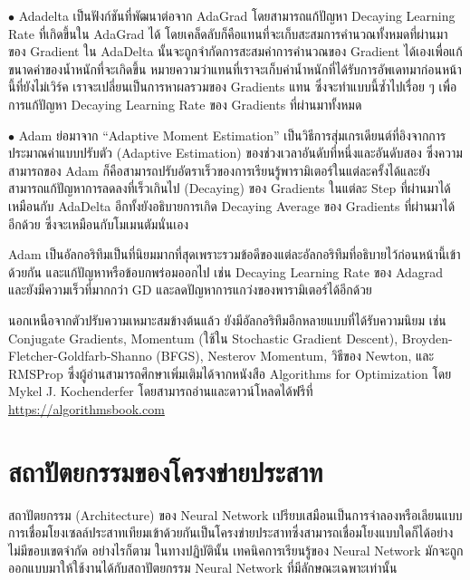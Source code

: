 \noindent $\bullet$ Adadelta เป็นฟังก์ชันที่พัฒนาต่อจาก AdaGrad โดยสามารถแก้ปัญหา Decaying Learning Rate ที่เกิดขึ้นใน
AdaGrad ได้ โดยเคล็ดลับก็คือแทนที่จะเก็บสะสมการคำนวณทั้งหมดที่ผ่านมาของ Gradient ใน AdaDelta นั้นจะถูกจำกัดการสะสมค่าการคำนวณของ
Gradient ได้เองเพื่อแก้ขนาดค่าของน้ำหนักที่จะเกิดขึ้น หมายความว่าแทนที่เราจะเก็บค่าน้ำหนักที่ได้รับการอัพเดทมาก่อนหน้านี้ที่ยังไม่เวิร์ค
เราจะเปลี่ยนเป็นการหาผลรวมของ Gradients แทน ซึ่งจะทำแบบนี้ซ้ำไปเรื่อย ๆ เพื่อการแก้ปัญหา Decaying Learning Rate ของ Gradients
ที่ผ่านมาทั้งหมด

\noindent $\bullet$ Adam ย่อมาจาก \enquote{Adaptive Moment Estimation} เป็นวิธีการสุ่มเกรเดียนต์ที่อิงจากการประมาณค่าแบบปรับตัว
(Adaptive Estimation) ของช่วงเวลาอันดับที่หนึ่งและอันดับสอง ซึ่งความสามารถของ Adam ก็คือสามารถปรับอัตราเร็วของการเรียนรู้พารามิเตอร์ในแต่ละครั้งได้และยังสามารถแก้ปัญหาการลดลงที่เร็วเกินไป (Decaying) ของ Gradients ในแต่ละ Step ที่ผ่านมาได้เหมือนกับ AdaDelta
อีกทั้งยังอธิบายการเกิด Decaying Average ของ Gradients ที่ผ่านมาได้อีกด้วย ซึ่งจะเหมือนกับโมเมนตัมนั่นเอง

Adam เป็นอัลกอริทึมเป็นที่นิยมมากที่สุดเพราะรวมข้อดีของแต่ละอัลกอริทึมที่อธิบายไว้ก่อนหน้านี้เข้าด้วยกัน และแก้ปัญหาหรือข้อบกพร่อมออกไป
เช่น Decaying Learning Rate ของ Adagrad และยังมีความเร็วที่มากกว่า GD และลดปัญหาการแกว่งของพารามิเตอร์ได้อีกด้วย

นอกเหนือจากตัวปรับความเหมาะสมข้างต้นแล้ว ยังมีอัลกอริทึมอีกหลายแบบที่ได้รับความนิยม เช่น Conjugate Gradients, Momentum (ใช้ใน
Stochastic Gradient Descent), Broyden-Fletcher-Goldfarb-Shanno (BFGS), Nesterov Momentum, วิธีของ Newton, และ
RMSProp ซึ่งผู้อ่านสามารถศึกษาเพิ่มเติมได้จากหนังสือ Algorithms for Optimization\autocite{kochenderfer2019} โดย Mykel J.
Kochenderfer โดยสามารถอ่านและดาวน์โหลดได้ฟรีที่ \url{https://algorithmsbook.com}

\section{สถาปัตยกรรมของโครงข่ายประสาท}
\label{sec:arch_nn}

สถาปัตยกรรม (Architecture) ของ Neural Network เปรียบเสมือนเป็นการจำลองหรือเลียนแบบการเชื่อมโยงเซลล์ประสาทเทียมเข้าด้วยกันเป็นโครงข่ายประสาทซึ่งสามารถเชื่อมโยงแบบใดก็ได้อย่างไม่มีขอบเขตจำกัด อย่างไรก็ตาม ในทางปฏิบัตินั้น เทคนิคการเรียนรู้ของ Neural Network
มักจะถูกออกแบบมาให้ใช้งานได้กับสถาปัตยกรรม Neural Network ที่มีลักษณะเฉพาะเท่านั้น

